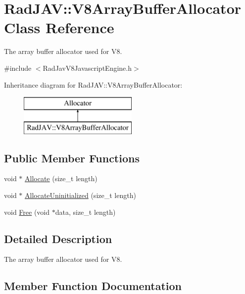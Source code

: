 \hypertarget{class_rad_j_a_v_1_1_v8_array_buffer_allocator}{}\section{Rad\+J\+AV\+:\+:V8\+Array\+Buffer\+Allocator Class Reference}
\label{class_rad_j_a_v_1_1_v8_array_buffer_allocator}


The array buffer allocator used for V8.  




{\ttfamily \#include $<$Rad\+Jav\+V8\+Javascript\+Engine.\+h$>$}

Inheritance diagram for Rad\+J\+AV\+:\+:V8\+Array\+Buffer\+Allocator\+:\begin{figure}[H]
\begin{center}
\leavevmode
\includegraphics[height=2.000000cm]{class_rad_j_a_v_1_1_v8_array_buffer_allocator}
\end{center}
\end{figure}
\subsection*{Public Member Functions}
\begin{DoxyCompactItemize}
\item 
void $\ast$ \hyperlink{class_rad_j_a_v_1_1_v8_array_buffer_allocator_a3d01e3a6442b8dcb8d4905f91f56bc03}{Allocate} (size\+\_\+t length)
\item 
void $\ast$ \hyperlink{class_rad_j_a_v_1_1_v8_array_buffer_allocator_a11d4ca11d80a94a04c68785ad69622ea}{Allocate\+Uninitialized} (size\+\_\+t length)
\item 
void \hyperlink{class_rad_j_a_v_1_1_v8_array_buffer_allocator_ad1a8dae221c3fb45f6280a4e0841a90e}{Free} (void $\ast$data, size\+\_\+t length)
\end{DoxyCompactItemize}


\subsection{Detailed Description}
The array buffer allocator used for V8. 

\subsection{Member Function Documentation}
